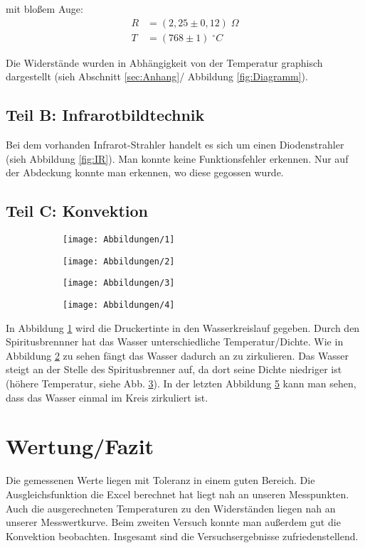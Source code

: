 \documentclass[a4paper]{scrartcl}
\numberwithin{equation}{subsection}
\begin{document}
mit bloßem Auge:
\begin{align*}
R&=(2,25\pm 0,12)\;\Omega\\
T&=(768 \pm 1)\;^\circ C
\end{align*}

Die Widerstände wurden in Abhängigkeit von der Temperatur graphisch dargestellt (sieh Abschnitt \ref{sec:Anhang}/ Abbildung \ref{fig:Diagramm}).

\subsection{Teil B: Infrarotbildtechnik}
Bei dem vorhanden Infrarot-Strahler handelt es sich um einen Diodenstrahler (sieh Abbildung \ref{fig:IR}).
Man konnte keine Funktionsfehler erkennen.
Nur auf der Abdeckung konnte man erkennen, wo diese gegossen wurde.
\subsection{Teil C: Konvektion}

\begin{figure}[H]
\begin{subfigure}{4cm}
\centering
\texttt{[image: Abbildungen/1]}
\caption{}
\label{a}
\end{subfigure}
\begin{subfigure}{4cm}
\centering
\texttt{[image: Abbildungen/2]}
\caption{}
\label{b}
\end{subfigure}
\begin{subfigure}{4cm}
\centering
\texttt{[image: Abbildungen/3]}
\caption{}
\label{c}
\end{subfigure}
\begin{subfigure}{4cm}
\centering
\texttt{[image: Abbildungen/4]}
\caption{}
\label{d}
\end{subfigure}
\caption{}
\end{figure}

In Abbildung \ref{a} wird die Druckertinte in den Wasserkreislauf gegeben.
Durch den Spiritusbrennner hat das Wasser unterschiedliche Temperatur/Dichte.
Wie in Abbildung \ref{b} zu sehen fängt das Wasser dadurch an zu zirkulieren.
Das Wasser steigt an der Stelle des Spiritusbrenner auf, da dort seine Dichte niedriger ist (höhere Temperatur, siehe Abb. \ref{c}).
In der letzten Abbildung \ref{d} kann man sehen, dass das Wasser einmal im Kreis zirkuliert ist.

\newpage
\section{Wertung/Fazit}
Die gemessenen Werte liegen mit Toleranz in einem guten Bereich.
Die Ausgleichsfunktion die Excel berechnet hat liegt nah an unseren Messpunkten.
Auch die ausgerechneten Temperaturen zu den Widerständen liegen nah an unserer Messwertkurve.
Beim zweiten Versuch konnte man außerdem gut die Konvektion beobachten.
Insgesamt sind die Versuchsergebnisse zufriedenstellend.
\end{document}
